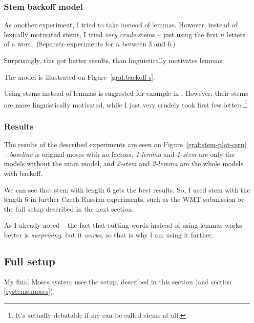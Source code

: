 \subsubsection{Stem backoff model}

As another experiment, I tried to take  instead of lemmas. However, instead of lexically motivated stems, I tried \emph{very crude} stems -- just using the first $n$ letters of a word. (Separate experiments for $n$ between 3 and 6.)

Surprisingly, this got better results, than linguistically motivates lemmas.


The model is illustrated on Figure~\ref{graf:backoff-s}.



Using stems instead of lemmas is suggested for example in \cite{stemy}. However, their stems are more linguistically motivated, while I just very crudely took first few letters.\footnote{It's actually debatable if my  can be called stems at all.}


\subsubsection{Results}


The results of the described experiments are seen on Figure~\ref{graf:stem-plot-csru} -- \emph{baseline} is original moses with no factors, \emph{1-lemma} and \emph{1-stem} are only the  models without the main model, and \emph{2-stem} and \emph{2-lemma} are the whole models with backoff.
 
We can see that stem with length 6 gets the best results. So, I used stem with the length 6 in further Czech-Russian experiments, such as the WMT submission \cite{mujpaper} or the full setup described in the next section.

As I already noted -- the fact that cutting words instead of using lemmas works better is \emph{surprising}, but it \emph{works}, so that is why I am using it further. 

\subsection{Full setup}
\label{experiments:mosesfull}
My final Moses system uses the setup, described in this section (and section \ref{systems:moses}). 


